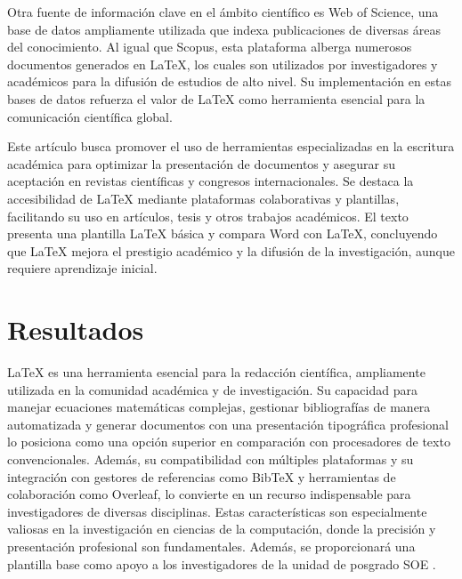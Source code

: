 \documentclass[10pt,twocolumn]{article}
\begin{document}
Otra fuente de información clave en el ámbito científico es Web of Science, una base de datos ampliamente utilizada que indexa publicaciones de diversas áreas del conocimiento. 
Al igual que Scopus, esta plataforma alberga numerosos documentos generados en LaTeX, los cuales son utilizados por investigadores y académicos para la difusión de estudios de alto nivel. 
Su implementación en estas bases de datos refuerza el valor de LaTeX como herramienta esencial para la comunicación científica global.

Este artículo busca promover el uso de herramientas especializadas en la escritura académica para optimizar la presentación de documentos y asegurar su aceptación en revistas científicas y congresos internacionales. 
Se destaca la accesibilidad de LaTeX mediante plataformas colaborativas y plantillas, facilitando su uso en artículos, tesis y otros trabajos académicos. 
El texto presenta una plantilla LaTeX básica y compara Word con LaTeX, concluyendo que LaTeX mejora el prestigio académico y la difusión de la investigación, aunque requiere aprendizaje inicial.

\newpage %
\vspace{0.5cm}

    \section{Resultados}
    LaTeX es una herramienta esencial para la redacción científica, ampliamente utilizada en la comunidad académica y de investigación. 
    Su capacidad para manejar ecuaciones matemáticas complejas, gestionar bibliografías de manera automatizada y generar documentos con una presentación tipográfica profesional lo posiciona como una opción superior en comparación con procesadores de texto convencionales. 
    Además, su compatibilidad con múltiples plataformas y su integración con gestores de referencias como BibTeX y herramientas de colaboración como Overleaf, lo convierte en un recurso indispensable para investigadores de diversas disciplinas. 
    Estas características son especialmente valiosas en la investigación en ciencias de la computación, donde la precisión y presentación profesional son fundamentales. 
    Además, se proporcionará una plantilla base como apoyo a los investigadores de la unidad de posgrado SOE \parencite{rivera2023inteligencias}.
\end{document}
